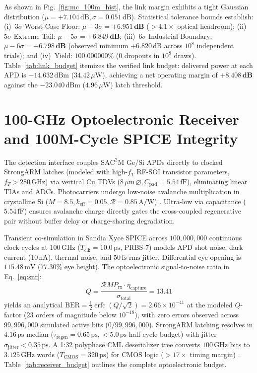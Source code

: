 \documentclass[letterpaper,10pt]{article}
\begin{document}
As shown in Fig.~\ref{fig:mc_100m_hist}, the link margin exhibits a tight Gaussian distribution ($\mu = +7.104\,\text{dB}, \sigma = 0.051\,\text{dB}$). Statistical tolerance bounds establish: (i)~$3\sigma$ Worst-Case Floor: $\mu - 3\sigma = \mathbf{+6.951\,\text{dB}}$ ($>4.1\times$ optical headroom); (ii)~$5\sigma$ Extreme Tail: $\mu - 5\sigma = \mathbf{+6.849\,\text{dB}}$; (iii)~$6\sigma$ Industrial Boundary: $\mu - 6\sigma = \mathbf{+6.798\,\text{dB}}$ (observed minimum $+6.820\,\text{dB}$ across $10^8$ independent trials); and (iv)~Yield: $\mathbf{100.000000\%}$ ($0$ dropouts in $10^8$ draws). Table~\ref{tab:link_budget} itemizes the verified link budget: delivered power at each APD is $-14.632\,\text{dBm}$ ($34.42\,\mu\text{W}$), achieving a net operating margin of $\mathbf{+8.408\,\text{dB}}$ against the $-23.040\,\text{dBm}$ ($4.96\,\mu\text{W}$) latch threshold.

\section{100-GHz Optoelectronic Receiver and 100M-Cycle SPICE Integrity}
The detection interface couples $\text{SAC}^2\text{M}$ Ge/Si APDs directly to clocked StrongARM latches (modeled with high-$f_T$ RF-SOI transistor parameters, $f_T > 280\,\text{GHz}$) via vertical Cu TDVs ($8\,\mu\text{m}\,\varnothing, C_{\text{pad}} = 5.54\,\text{fF}$), eliminating linear TIAs and ADCs. Photocarriers undergo low-noise avalanche multiplication in crystalline Si ($M=8.5, k_{\text{eff}} = 0.05, \mathcal{R} = 0.85\,\text{A/W}$) \cite{Shi2025Nature, McIntyre1966}. Ultra-low via capacitance ($5.54\,\text{fF}$) ensures avalanche charge directly gates the cross-coupled regenerative pair without buffer delay or charge-sharing degradation.

Transient co-simulation in Sandia Xyce SPICE across $100,000,000$ continuous clock cycles at $100\,\text{GHz}$ ($T_{\text{clk}} = 10.0\,\text{ps}$, PRBS-7) models APD shot noise, dark current ($10\,\text{nA}$), thermal noise, and $50\,\text{fs~rms}$ jitter. Differential eye opening is $115.48\,\text{mV}$ ($77.30\%$ eye height). The optoelectronic signal-to-noise ratio in Eq.~\eqref{eq:snr}:
\begin{equation}
Q = \frac{\mathcal{R} M P_{\text{rx}} \cdot \eta_{\text{capture}}}{\sigma_{\text{total}}} = 13.41
\label{eq:snr}
\end{equation}
yields an analytical $\text{BER} = \frac{1}{2}\operatorname{erfc}(Q/\sqrt{2}) = 2.66 \times 10^{-41}$ at the modeled $Q$-factor ($23$ orders of magnitude below $10^{-18}$), with zero errors observed across $99,996,000$ simulated active bits ($0/99,996,000$). StrongARM latching resolves in $4.16\,\text{ps}$ median ($\tau_{\text{regen}} = 0.65\,\text{ps}, <5.0\,\text{ps}$ half-cycle budget) with jitter $\sigma_{\text{jitter}} < 0.35\,\text{ps}$. A 1:32 polyphase CML deserializer tree converts $100\,\text{GHz}$ bits to $3.125\,\text{GHz}$ words ($T_{\text{CMOS}} = 320\,\text{ps}$) for CMOS logic ($>17\times$ timing margin) \cite{Schinkel2007}. Table~\ref{tab:receiver_budget} outlines the complete optoelectronic budget.
\end{document}
